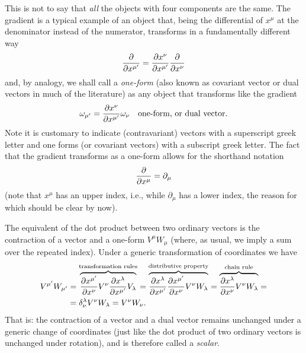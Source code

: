 This is not to say that \emph{all} the objects with four components are the same.
The gradient is a typical example of an object that, being the differential of
$x^\mu$ at the denominator instead of the numerator, transforms in a fundamentally
different way
\begin{align*}
  \pdv{}{x^{\mu'}} = \pdv{x^\nu}{x^{\mu'}} \pdv{}{x^{\nu}}
\end{align*}
and, by analogy, we shall call a \emph{one-form} (also known as covariant vector
or dual vectors in much of the literature) as any object that transforms like the
gradient
\begin{align}
  \omega_{\mu'} = \pdv{x^\nu}{x^{\mu'}} \omega_\nu \quad\text{one-form, or dual vector}.
\end{align}
Note it is customary to indicate (contravariant) vectors with a superscript greek
letter and one forms (or covariant vectors) with a subscript greek letter. The fact
that the gradient transforms as a one-form allows for the shorthand notation
\begin{align*}
  \pdv{}{x^\mu} = \partial_\mu
\end{align*}
(note that $x^\mu$ has an upper index, i.e., while $\partial_\mu$ has a lower index,
the reason for which should be clear by now).

The equivalent of the dot product between two ordinary vectors is the contraction
of a vector and a one-form $V^\mu W_\mu$ (where, as usual, we imply
a sum over the repeated index). Under a generic transformation of coordinates we
have
\begin{align*}
  V^{\mu'} W_{\mu'} & =
  \overbrace{\pdv{x^{\mu'}}{x^\nu} V^\nu \pdv{x^\lambda}{x^{\mu'}} V_\lambda}^{\text{transformation rules}} =
  \overbrace{\pdv{x^\lambda}{x^{\mu'}} \pdv{x^{\mu'}}{x^\nu} V^\nu W_\lambda}^{\text{distributive property}} =
  \overbrace{\pdv{x^\lambda}{x^\nu} V^\nu W_\lambda}^{\text{chain rule}} =\\
  & = \delta^\lambda_\nu V^\nu W_\lambda = V^\nu W_\nu.
\end{align*}
That is: the contraction of a vector and a dual vector remains unchanged under a
generic change of coordinates (just like the dot product of two ordinary vectors
is unchanged under rotation), and is therefore called a \emph{scalar}.

